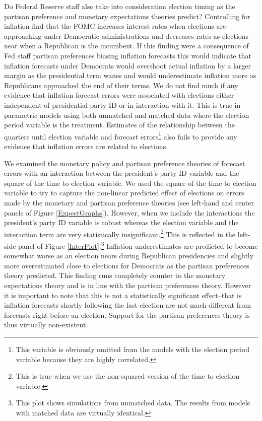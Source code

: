 \documentclass[a4paper]{article}\usepackage{graphicx, color}
\begin{document}
Do Federal Reserve staff also take into consideration election timing as the partisan preference and monetary expectations theories predict?  Controlling for inflation \cite{Clark2012} find that the FOMC increases interest rates when elections are approaching under Democratic administrations and decreases rates as elections near when a Republican is the incumbent. If this finding were a consequence of Fed staff partisan preferences biasing inflation forecasts this would indicate that inflation forecasts under Democrats would overshoot actual inflation by a larger margin as the presidential term wanes and would underestimate inflation more as Republicans approached the end of their terms.  We do not find much if any evidence that inflation forecast errors were associated with elections either independent of presidential party ID or in interaction with it. This is true in parametric models using both unmatched and matched data where the election period variable is the treatment. Estimates of the relationship between the quarters until election variable and forecast errors\footnote{This variable is obviously omitted from the models with the election period variable because they are highly correlated.} also fails to provide any evidence that inflation errors are related to elections. 

We examined the monetary policy and partisan preference theories of forecast errors with an interaction between the president's party ID variable and the square of the time to election variable. We used the square of the time to election variable to try to capture the non-linear predicted effect of elections on errors made by the monetary and partisan preference theories (see left-hand and center panels of Figure \ref{ExpectGraphs}). However, when we include the interactions the president's party ID variable is robust whereas the election variable and the interaction term are very statistically insignificant.\footnote{This is true when we use the non-squared version of the time to election variable.} This is reflected in the left-side panel of Figure \ref{InterPlot}.\footnote{This plot shows simulations from unmatched data. The results from models with matched data are virtually identical.} Inflation underestimates are predicted to become somewhat worse as an election nears during Republican presidencies and slightly more overestimated close to elections for Democrats as the partisan preferences theory predicted. This finding runs completely counter to the monetary expectations theory and is in line with the partisan preferences theory. However it is important to note that this is not a statistically significant effect--that is inflation forecasts shortly following the last election are not much different from forecasts right before an election. Support for the partisan preferences theory is thus virtually non-existent.
\end{document}
